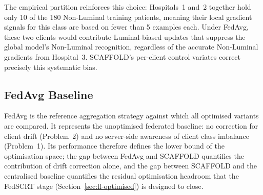 The empirical partition reinforces this choice:
Hospitals~1 and~2 together hold only 10 of the
180 Non-Luminal training patients, meaning their
local gradient signals for this class are based
on fewer than 5 examples each.
Under FedAvg, these two clients would contribute
Luminal-biased updates that suppress the global
model's Non-Luminal recognition, regardless of
the accurate Non-Luminal gradients from Hospital~3.
SCAFFOLD's per-client control variates correct
precisely this systematic bias.

\begin{table}[htbp]
  \centering
  \caption{Aggregation strategy selection rationale.
    The primary bottleneck in this thesis is client
    drift under non-IID data with uniform local steps.}
  \label{tab:agg-choice}
  \renewcommand{\arraystretch}{1.3}
\end{table}

\subsection{FedAvg Baseline}
\label{sec:fedavg-baseline}

FedAvg \cite{mcmahan2017fedavg} is the reference
aggregation strategy against which all optimised
variants are compared.
It represents the unoptimised federated baseline:
no correction for client drift (Problem~2) and no
server-side awareness of client class imbalance
(Problem~1).
Its performance therefore defines the lower bound
of the optimisation space; the gap between FedAvg
and SCAFFOLD quantifies the contribution of drift
correction alone, and the gap between SCAFFOLD and
the centralised baseline quantifies the residual
optimisation headroom that the FedSCRT stage
(Section~\ref{sec:fl-optimised}) is designed to
close.


